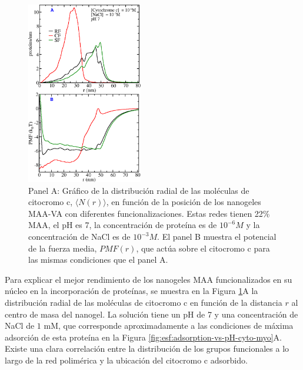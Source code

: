 
\begin{figure}[!htb]
     \centering
     \includegraphics[width=0.45\textwidth]{Figures/graphs-gel2/cyto-adsr-pmf.png}
     \caption{Panel A: Gr\'afico de la distribuci\'on radial de las mol\'eculas de citocromo c, $\langle N(r)\rangle$, en funci\'on de la posici\'on de los nanogeles MAA-VA con diferentes funcionalizaciones.
     	Estas redes tienen 22\% MAA, el pH es 7, la concentraci\'on de prote\'ina es de $10^{-6}M$ y la concentraci\'on de NaCl es de $10^{-3}M$.
     	El panel B muestra el potencial de la fuerza media, ${PMF}(r)$, que act\'ua sobre el citocromo c para las mismas condiciones que el panel A.}
     \label{fig:esf:adsorption-vs-r-cyto}
 \end{figure}



Para explicar el mejor rendimiento de los nanogeles MAA funcionalizados en su n\'ucleo en la incorporaci\'on de prote\'inas, se muestra en la Figura \ref{fig:esf:adsorption-vs-r-cyto}A la distribuci\'on radial de las mol\'eculas de citocromo c en funci\'on de la distancia $r$ al centro de masa del nanogel. La solución tiene un pH de 7 y una concentración de NaCl de $1 $ mM, que corresponde aproximadamente a las condiciones de m\'axima adsorci\'on de esta prote\'ina en la Figura \ref{fig:esf:adsorption-vs-pH-cyto-myo}A. Existe una clara correlaci\'on entre la distribuci\'on de los grupos funcionales a lo largo de la red polim\'erica y la ubicaci\'on del citocromo c adsorbido.

